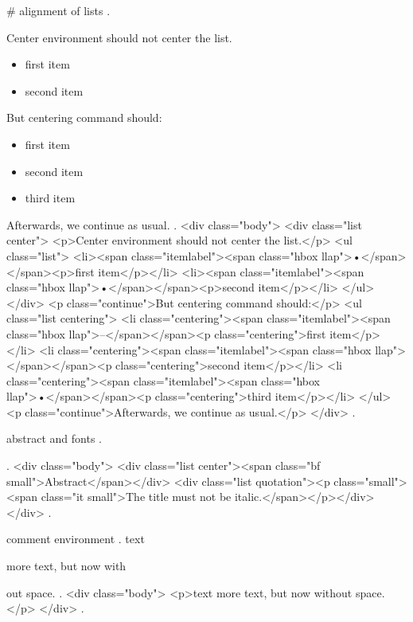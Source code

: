 #
alignment of lists
.
\begin{center}
    Center environment should not center the list.
    \begin{itemize}
        \item first item
        \item second item
    \end{itemize}
\end{center}
But centering command should:
\begin{itemize}
    \centering
    \item[\textendash] first item
    \item[] second item
    \item third item
\end{itemize}
Afterwards, we continue as usual.
.
<div class="body">
<div class="list center">
<p>Center environment should not center the list.</p>
<ul class="list">
<li><span class="itemlabel"><span class="hbox llap">•</span></span><p>ﬁrst item</p></li>
<li><span class="itemlabel"><span class="hbox llap">•</span></span><p>second item</p></li>
</ul>
</div>
<p class="continue">But centering command should:</p>
<ul class="list centering">
<li class="centering"><span class="itemlabel"><span class="hbox llap">–</span></span><p class="centering">ﬁrst item</p></li>
<li class="centering"><span class="itemlabel"><span class="hbox llap"></span></span><p class="centering">second item</p></li>
<li class="centering"><span class="itemlabel"><span class="hbox llap">•</span></span><p class="centering">third item</p></li>
</ul>
<p class="continue">Afterwards, we continue as usual.</p>
</div>
.


abstract and fonts
.
\begin{abstract}
\itshape
The title must not be italic.
\end{abstract}
.
<div class="body">
<div class="list center"><span class="bf small">Abstract</span></div>
<div class="list quotation"><p class="small"><span class="it small">The title must not be italic.</span></p></div>
</div>
.


comment environment
.
text

more text, but now with%

out space.
.
<div class="body">
<p>text more text, but now without space.</p>
</div>
.
